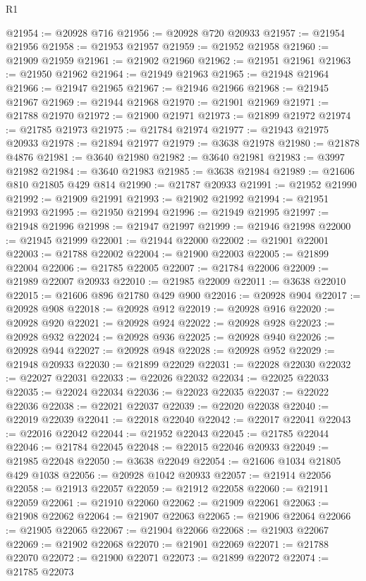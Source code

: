 \begin{lexlean}{R1}
\begin{coremodule}
@21954 := @20928 @716
@21956 := @20928 @720 @20933
@21957 := @21954 @21956
@21958 := @21953 @21957
@21959 := @21952 @21958
@21960 := @21909 @21959
@21961 := @21902 @21960
@21962 := @21951 @21961
@21963 := @21950 @21962
@21964 := @21949 @21963
@21965 := @21948 @21964
@21966 := @21947 @21965
@21967 := @21946 @21966
@21968 := @21945 @21967
@21969 := @21944 @21968
@21970 := @21901 @21969
@21971 := @21788 @21970
@21972 := @21900 @21971
@21973 := @21899 @21972
@21974 := @21785 @21973
@21975 := @21784 @21974
@21977 := @21943 @21975 @20933
@21978 := @21894 @21977
@21979 := @3638 @21978
@21980 := @21878 @4876
@21981 := @3640 @21980
@21982 := @3640 @21981
@21983 := @3997 @21982
@21984 := @3640 @21983
@21985 := @3638 @21984
@21989 := @21606 @810 @21805 @429 @814
@21990 := @21787 @20933
@21991 := @21952 @21990
@21992 := @21909 @21991
@21993 := @21902 @21992
@21994 := @21951 @21993
@21995 := @21950 @21994
@21996 := @21949 @21995
@21997 := @21948 @21996
@21998 := @21947 @21997
@21999 := @21946 @21998
@22000 := @21945 @21999
@22001 := @21944 @22000
@22002 := @21901 @22001
@22003 := @21788 @22002
@22004 := @21900 @22003
@22005 := @21899 @22004
@22006 := @21785 @22005
@22007 := @21784 @22006
@22009 := @21989 @22007 @20933
@22010 := @21985 @22009
@22011 := @3638 @22010
@22015 := @21606 @896 @21780 @429 @900
@22016 := @20928 @904
@22017 := @20928 @908
@22018 := @20928 @912
@22019 := @20928 @916
@22020 := @20928 @920
@22021 := @20928 @924
@22022 := @20928 @928
@22023 := @20928 @932
@22024 := @20928 @936
@22025 := @20928 @940
@22026 := @20928 @944
@22027 := @20928 @948
@22028 := @20928 @952
@22029 := @21948 @20933
@22030 := @21899 @22029
@22031 := @22028 @22030
@22032 := @22027 @22031
@22033 := @22026 @22032
@22034 := @22025 @22033
@22035 := @22024 @22034
@22036 := @22023 @22035
@22037 := @22022 @22036
@22038 := @22021 @22037
@22039 := @22020 @22038
@22040 := @22019 @22039
@22041 := @22018 @22040
@22042 := @22017 @22041
@22043 := @22016 @22042
@22044 := @21952 @22043
@22045 := @21785 @22044
@22046 := @21784 @22045
@22048 := @22015 @22046 @20933
@22049 := @21985 @22048
@22050 := @3638 @22049
@22054 := @21606 @1034 @21805 @429 @1038
@22056 := @20928 @1042 @20933
@22057 := @21914 @22056
@22058 := @21913 @22057
@22059 := @21912 @22058
@22060 := @21911 @22059
@22061 := @21910 @22060
@22062 := @21909 @22061
@22063 := @21908 @22062
@22064 := @21907 @22063
@22065 := @21906 @22064
@22066 := @21905 @22065
@22067 := @21904 @22066
@22068 := @21903 @22067
@22069 := @21902 @22068
@22070 := @21901 @22069
@22071 := @21788 @22070
@22072 := @21900 @22071
@22073 := @21899 @22072
@22074 := @21785 @22073

\end{coremodule}
\end{lexlean}
